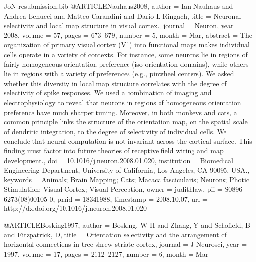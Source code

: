 \documentclass{article}
\begin{document}
\begin{filecontents}{JoN-resubmission.bib}
@ARTICLE{Nauhaus2008,
  author = {Ian Nauhaus and Andrea Benucci and Matteo Carandini and Dario L Ringach},
  title = {Neuronal selectivity and local map structure in visual cortex.},
  journal = {Neuron},
  year = {2008},
  volume = {57},
  pages = {673--679},
  number = {5},
  month = {Mar},
  abstract = {The organization of primary visual cortex (V1) into functional maps
	makes individual cells operate in a variety of contexts. For instance,
	some neurons lie in regions of fairly homogeneous orientation preference
	(iso-orientation domains), while others lie in regions with a variety
	of preferences (e.g., pinwheel centers). We asked whether this diversity
	in local map structure correlates with the degree of selectivity
	of spike responses. We used a combination of imaging and electrophysiology
	to reveal that neurons in regions of homogeneous orientation preference
	have much sharper tuning. Moreover, in both monkeys and cats, a common
	principle links the structure of the orientation map, on the spatial
	scale of dendritic integration, to the degree of selectivity of individual
	cells. We conclude that neural computation is not invariant across
	the cortical surface. This finding must factor into future theories
	of receptive field wiring and map development.},
  doi = {10.1016/j.neuron.2008.01.020},
  institution = {Biomedical Engineering Department, University of California, Los
	Angeles, CA 90095, USA.},
  keywords = {Animals; Brain Mapping; Cats; Macaca fascicularis; Neurons; Photic
	Stimulation; Visual Cortex; Visual Perception},
  owner = {judithlaw},
  pii = {S0896-6273(08)00105-0},
  pmid = {18341988},
  timestamp = {2008.10.07},
  url = {http://dx.doi.org/10.1016/j.neuron.2008.01.020}
}

@ARTICLE{Bosking1997,
  author = {Bosking, W H and Zhang, Y and Schofield, B and Fitzpatrick, D},
  title = {{Orientation selectivity and the arrangement of horizontal connections
	in tree shrew striate cortex}},
  journal = {J Neurosci},
  year = {1997},
  volume = {17},
  pages = {2112--2127},
  number = {6},
  month = {Mar}
}


\end{filecontents}
\end{document}
